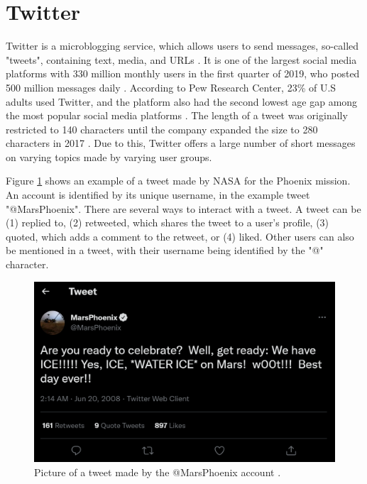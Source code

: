 \section{Twitter}
Twitter is a microblogging service, which allows users to send messages, so-called "tweets", containing text, media, and URLs \cite{DBLP:journals/csur/GiachanouC16}. It is one of the largest social media platforms with 330 million monthly users in the first quarter of 2019, who posted 500 million messages daily \cite{twitter:users}. According to Pew Research Center, 23\% of U.S adults used Twitter, and the platform also had the second lowest age gap among the most popular social media platforms \cite{pew:socialmedia}. The length of a tweet was originally restricted to 140 characters until the company expanded the size to 280 characters in 2017 \cite{twitter:characters}. Due to this, Twitter offers a large number of short messages on varying topics made by varying user groups. 

Figure \ref{fig:example_tweet} shows an example of a tweet made by NASA for the Phoenix mission. An account is identified by its unique username, in the example tweet "@MarsPhoenix". There are several ways to interact with a tweet. A tweet can be (1) replied to, (2) retweeted, which shares the tweet to a user's profile, (3) quoted, which adds a comment to the retweet, or (4) liked. Other users can also be mentioned in a tweet, with their username being identified by the "@" character. 

\begin{figure}
    \centering
    \includegraphics[scale=0.3]{Images/twitter_image.png}
    \caption{Picture of a tweet made by the @MarsPhoenix account \cite{twitter:tweet}.}
    \label{fig:example_tweet}
\end{figure}

